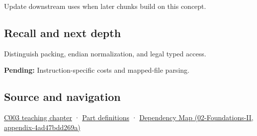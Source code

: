 Update downstream uses when later chunks build on this concept.

\subsection{Recall and next depth}\label{appendix-0682dbfc5f0e-recall-and-next-depth}

Distinguish packing, endian normalization, and legal typed access.

\textbf{Pending:} Instruction-specific costs and mapped-file parsing.

\subsection{Source and navigation}\label{appendix-0682dbfc5f0e-source-and-navigation}

\hyperref[01-foundations-i-ch002-where-the-bytes-live]{C003 teaching chapter} · \hyperref[appendix-fd090d982a15-m003---parts-41-60]{Part definitions} · \href{../02-Foundations-II/main.pdf\#nameddest=appendix-4ad47bdd269a}{Dependency Map (02-Foundations-II, appendix-4ad47bdd269a)}
